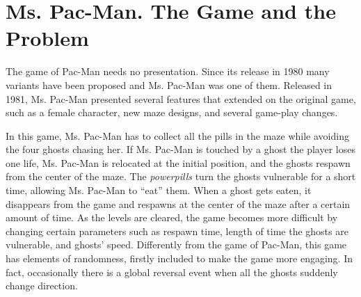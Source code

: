 \documentclass{llncs}
\begin{document}
%
%

\section{Ms. Pac-Man. The Game and the Problem}
\label{sec:mspacman_problem}

The game of Pac-Man needs no presentation. Since its release in 1980 many variants have been proposed and Ms. Pac-Man was one of them. Released in 1981, Ms. Pac-Man presented several features that extended on the original game, such as a female character, new maze designs, and several game-play changes.

In this game, Ms. Pac-Man has to collect all the pills in the maze while avoiding the four ghosts chasing her. If Ms. Pac-Man is touched by a ghost the player loses one life, Ms. Pac-Man is relocated at the initial position, and the ghosts respawn from the center of the maze. The {\em powerpills} turn the ghosts vulnerable for a short time, allowing Ms. Pac-Man to ``eat'' them. When a ghost gets eaten, it disappears from the game and respawns at the center of the maze after a certain amount of time. As the levels are cleared, the game becomes more difficult by changing certain parameters such as respawn time, length of time the ghosts are vulnerable, and ghosts' speed. Differently from the game of Pac-Man, this game has elements of randomness, firstly included to make the game more engaging. In fact, occasionally there is a global reversal event when all the ghosts suddenly change direction.
\end{document}

